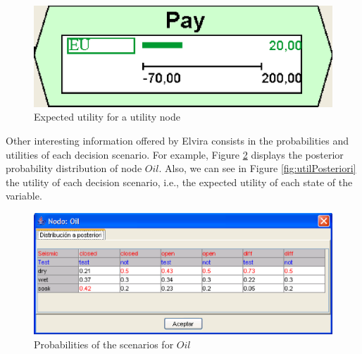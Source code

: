 \begin{figure}[h]
\begin{center}
\includegraphics[scale=0.4]{./ID/fig/utilityExpanded.eps} \vspace{-0.5cm}
\end{center}
\caption{Expected utility for a utility node}
\label{fig:utilityExpanded}
\end{figure}

Other interesting information offered by Elvira consists in the
probabilities and utilities of each decision scenario. For example, Figure %
\ref{fig:distribPosteriori} displays the posterior probability distribution
of node $Oil$. Also, we can see in Figure \ref{fig:utilPosteriori} the
utility of each decision scenario, i.e., the expected utility of each state
of the variable.

\begin{figure}[h]
\begin{center}
\includegraphics[scale=0.4]{./ID/fig/distribPosteriori.eps} \vspace{-0.5cm}
\end{center}
\caption{Probabilities of the scenarios for $Oil$}
\label{fig:distribPosteriori}
\end{figure}

